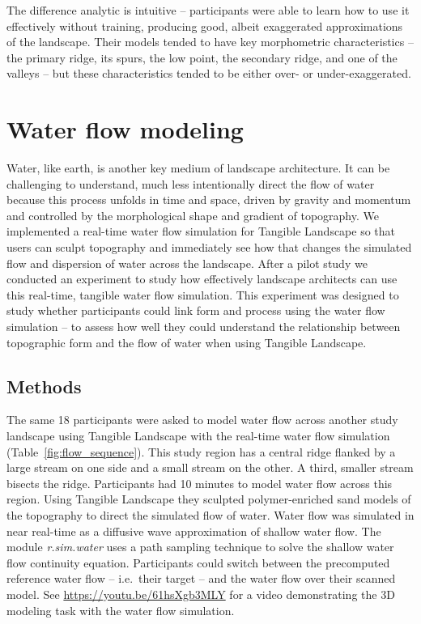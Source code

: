 \documentclass[Afour,sagev,times]{sagej} %
\begin{document}
The difference analytic is intuitive -- 
participants were able to learn how to use it effectively without training, 
producing good, albeit exaggerated approximations of the landscape. 
%
Their models tended to have key morphometric characteristics -- 
the primary ridge, its spurs, the low point, 
the secondary ridge, and one of the valleys -- 
but these characteristics tended to be 
either over- or under-exaggerated.



\section{Water flow modeling}

Water, like earth, is another key medium of landscape architecture.
It can be challenging to understand, much less intentionally direct
the flow of water because this process
unfolds in time and space, 
driven by gravity and momentum and
controlled by the morphological shape and gradient of topography.
We implemented a real-time water flow simulation 
for Tangible Landscape 
so that users can sculpt topography 
and immediately see how that changes 
the simulated flow and dispersion of water
across the landscape.
After a pilot study \cite{Harmon2016}
we conducted an experiment to study 
how effectively landscape architects
can use this real-time, tangible water flow simulation.
This experiment was designed to study whether
participants could link form and process
using the water flow simulation -- to assess
how well they could understand the relationship 
between topographic form 
and the flow of water 
when using Tangible Landscape.

\subsection{Methods}
The same 18 participants were asked to model water flow 
across another study landscape
using Tangible Landscape 
with the real-time water flow simulation 
(Table~\ref{fig:flow_sequence}).
This study region has a central ridge 
flanked by a large stream on one side 
and a small stream on the other.  
A third, smaller stream bisects the ridge.
Participants had 10 minutes to model water flow across this region.
Using Tangible Landscape
they sculpted polymer-enriched sand models of the topography
to direct the simulated flow of water.  
Water flow was simulated in near real-time 
as a diffusive wave approximation of shallow water flow.
The module \textit{r.sim.water} \cite{r.sim.water}
uses a path sampling technique to solve 
the shallow water flow continuity equation. \cite{Mitasova2004}
Participants could switch between 
the precomputed reference water flow -- i.e.~their target -- 
and the water flow over their scanned model.
See \url{https://youtu.be/61hsXgb3MLY}
for a video demonstrating the 3D modeling task 
with the water flow simulation.
\end{document}
